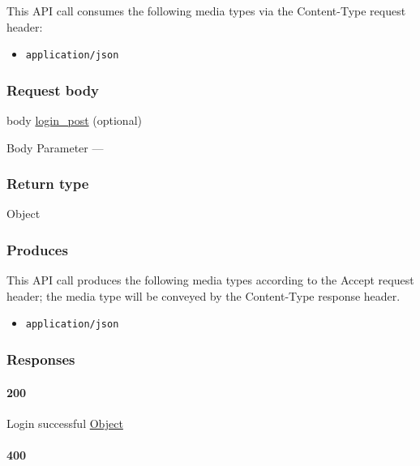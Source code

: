 This API call consumes the following media types via the {Content-Type}
request header:

\begin{itemize}
\tightlist
\item
  \texttt{application/json}
\end{itemize}

\hypertarget{request-body-2}{%
\subsubsection{Request body}\label{request-body-2}}

body \protect\hyperlink{login_post}{login\_post} (optional)

{Body Parameter} ---

\hypertarget{return-type-5}{%
\subsubsection{Return type}\label{return-type-5}}

Object

\hypertarget{produces-7}{%
\subsubsection{Produces}\label{produces-7}}

This API call produces the following media types according to the
{Accept} request header; the media type will be conveyed by the
{Content-Type} response header.

\begin{itemize}
\tightlist
\item
  \texttt{application/json}
\end{itemize}

\hypertarget{responses-7}{%
\subsubsection{Responses}\label{responses-7}}

\hypertarget{section-23}{%
\paragraph{200}\label{section-23}}

Login successful \protect\hyperlink{Object}{Object}

\hypertarget{section-24}{%
\paragraph{400}\label{section-24}}

